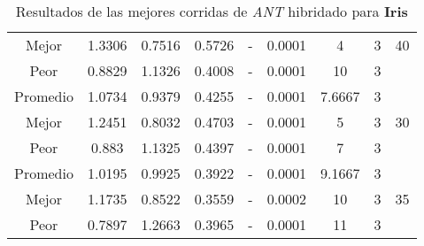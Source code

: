 \begin{table}[h!]
\begin{center}
\begin{tabular}{|c|c|c|c|c|c|c|c|c|}
            \cline{1-8}
            Mejor & 1.3306 & 0.7516  & 0.5726 & - & 0.0001 & 4 & 3 & 40\\
            \cline{1-8}
            Peor & 0.8829 & 1.1326  & 0.4008 & - & 0.0001 & 10 & 3 & \\
        \hline
        \hline
            Promedio  & 1.0734 & 0.9379 & 0.4255 & - & 0.0001 & 7.6667 & 3 & \\
            \cline{1-8}
            Mejor & 1.2451 & 0.8032  & 0.4703 & - & 0.0001 & 5 & 3 & 30\\
            \cline{1-8}
            Peor & 0.883 & 1.1325  & 0.4397 & - & 0.0001 & 7 & 3 & \\
        \hline
        \hline
            Promedio  & 1.0195 & 0.9925 & 0.3922 & - & 0.0001 & 9.1667 & 3 & \\
            \cline{1-8}
            Mejor & 1.1735 & 0.8522  & 0.3559 & - & 0.0002 & 10 & 3 & 35\\
            \cline{1-8}
            Peor & 0.7897 & 1.2663  & 0.3965 & - & 0.0001 & 11 & 3 & \\
        \hline
        \end{tabular}
        \caption{Resultados de las mejores corridas de \emph{ANT} hibridado para {\bf Iris}}
        \label{tb:tableanthibcsv}
    \end{center}
\end{table}
